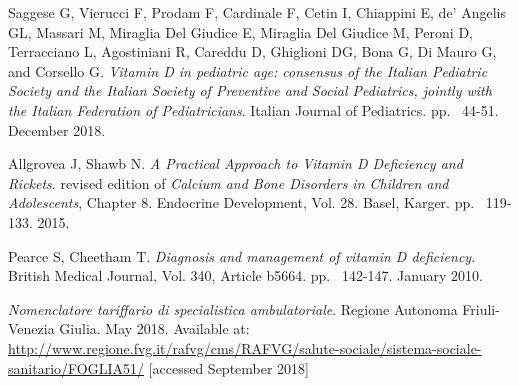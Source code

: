 \begin{thebibliography}{50}
  Saggese G, Vierucci F, Prodam F, Cardinale F, Cetin I, Chiappini E, de’ Angelis GL, Massari M, Miraglia Del Giudice E, Miraglia Del Giudice M, Peroni D, Terracciano L, Agostiniani R, Careddu D, Ghiglioni DG, Bona G, Di Mauro G, and Corsello G.
  \textit{Vitamin D in pediatric age: consensus of the Italian Pediatric Society and the Italian Society of Preventive and Social Pediatrics, jointly with the Italian Federation of Pediatricians}.
  Italian Journal of Pediatrics.
  pp. ~44-51.
  December 2018.
  
  Allgrovea J, Shawb N.
  \textit{A Practical Approach to Vitamin D Deficiency and Rickets}.
   revised edition of \textit{Calcium and Bone Disorders in Children and Adolescents}, Chapter 8.
  Endocrine Development, Vol. 28.
  Basel, Karger.
  pp. ~119-133.
  2015.
  
  Pearce S, Cheetham T.
  \textit{Diagnosis and management of vitamin D deficiency}.
  British Medical Journal, Vol. 340, Article b5664.
  pp. ~142-147.
  January 2010.
  
  \textit{Nomenclatore tariffario di specialistica ambulatoriale}.
  Regione Autonoma Friuli-Venezia Giulia.
  May 2018.
  Available at: \url{http://www.regione.fvg.it/rafvg/cms/RAFVG/salute-sociale/sistema-sociale-sanitario/FOGLIA51/} [accessed September 2018]

\end{thebibliography}